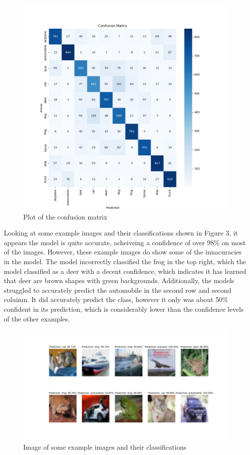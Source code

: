 \documentclass[letterpaper, 12pt]{article}
\begin{document}
\begin{figure}[H]
\centering
\includegraphics[scale = 0.5]{confusion_matrix}
\caption{Plot of the confusion matrix}
\end{figure}

Looking at some example images and their classifications shown in Figure 3, it appears the model is quite accurate, acheiveing a confidence of over 98\% on most of the images. However, these example images do show some of the innacuracies in the model. The model incorrectly classified the frog in the top right, which the model classified as a deer with a decent confidence, which indicates it has learned that deer are brown shapes with green backgrounds. Additionally, the models struggled to accurately predict the automobile in the second row and second coluimn.  It did accurately predict the class, however it only was about 50\% confident in its prediction, which is considerably lower than the confidence levels of the other examples.

\begin{figure}[H]
\centering
\includegraphics[scale = 0.5]{example_predictions}
\caption{Image of some example images and their classifications}
\end{figure}
\end{document}
